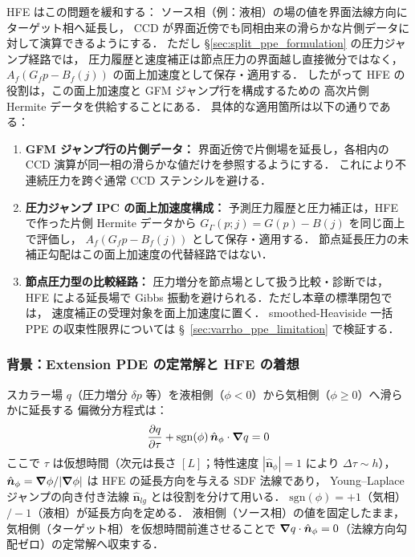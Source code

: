HFE はこの問題を緩和する：
ソース相（例：液相）の場の値を界面法線方向にターゲット相へ延長し，
CCD が界面近傍でも同相由来の滑らかな片側データに対して演算できるようにする．
ただし §\ref{sec:split_ppe_formulation} の圧力ジャンプ経路では，
圧力履歴と速度補正は節点圧力の界面越し直接微分ではなく，
$A_f(G_fp-B_f(j))$ の面上加速度として保存・適用する．
したがって HFE の役割は，この面上加速度と GFM ジャンプ行を構成するための
高次片側 Hermite データを供給することにある．
具体的な適用箇所は以下の通りである：
\begin{enumerate}[noitemsep]
  \item \textbf{GFM ジャンプ行の片側データ：}
        界面近傍で片側場を延長し，各相内の CCD 演算が同一相の滑らかな値だけを参照するようにする．
        これにより不連続圧力を跨ぐ通常 CCD ステンシルを避ける．
  \item \textbf{圧力ジャンプ IPC の面上加速度構成：}
        予測圧力履歴と圧力補正は，HFE で作った片側 Hermite データから
        $G_\Gamma(p;j)=G(p)-B(j)$ を同じ面上で評価し，
        $A_f(G_fp-B_f(j))$ として保存・適用する．
        節点延長圧力の未補正勾配はこの面上加速度の代替経路ではない．
  \item \textbf{節点圧力型の比較経路：}
        圧力増分を節点場として扱う比較・診断では，
        HFE による延長場で Gibbs 振動を避けられる．ただし本章の標準閉包では，
        速度補正の受理対象を面上加速度に置く．
        smoothed-Heaviside 一括 PPE の収束性限界については
        §~\ref{sec:varrho_ppe_limitation} で検証する．
\end{enumerate}

\subsubsection{背景：Extension PDE の定常解と HFE の着想}

スカラー場 $q$（圧力増分 $\delta p$ 等）を液相側（$\phi < 0$）から気相側（$\phi \ge 0$）へ滑らかに延長する
偏微分方程式は：
\begin{equation}
  \frac{\partial q}{\partial \tau} + \mathrm{sgn}(\phi)\,\hat{\bm n}_{\phi}\cdot\bm{\nabla} q = 0
  \label{eq:extension_pde_main}
\end{equation}
ここで $\tau$ は仮想時間（次元は長さ $[L]$；特性速度 $|\hat{\bm n}_{\phi}| = 1$ により $\Delta\tau \sim h$），
$\hat{\bm n}_{\phi} = \bm{\nabla}\phi/|\bm{\nabla}\phi|$ は HFE の延長方向を与える SDF 法線であり，
Young--Laplace ジャンプの向き付き法線 $\hat{\bm n}_{lg}$ とは役割を分けて用いる．
$\mathrm{sgn}(\phi) = +1$（気相）$/-1$（液相）が延長方向を定める．
液相側（ソース相）の値を固定したまま，気相側（ターゲット相）を仮想時間前進させることで
$\bm{\nabla} q \cdot \hat{\bm n}_{\phi} = 0$（法線方向勾配ゼロ）の定常解へ収束する．

